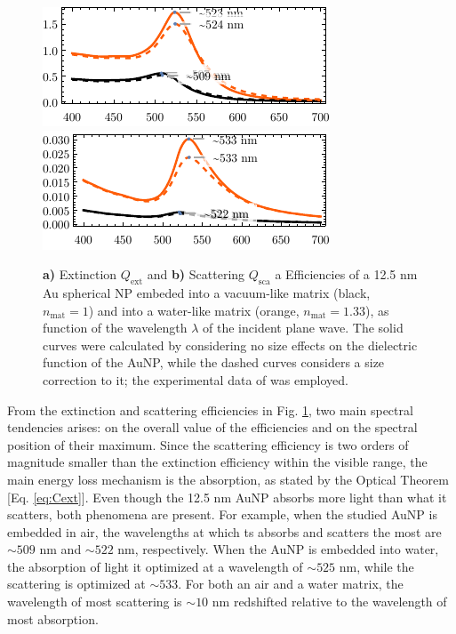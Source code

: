  \begin{figure}[h!]
 \includegraphics[scale=1.4]{1-Theory-Figs/Mie-Au/extinction-12--5nm-Au-in-H2O.pdf}
 \includegraphics[scale=1.4]{1-Theory-Figs/Mie-Au/scattering-12--5nm-Au-in-H2O.pdf}
\caption[Extinction and Scattering Corss Section of a 12.5 nm Au spherical NP embeded into a vacuum- and into a waterlike environment]{ \textbf{a)} Extinction $Q_\text{ext}$ and \textbf{b)} Scattering $Q_\text{sca}$ a Efficiencies of a 12.5 nm Au spherical NP embeded into a vacuum-like matrix (black, $n_\text{mat} = 1$)  and into a water-like matrix (orange, $n_\text{mat} = 1.33$), as function of  the wavelength $\lambda$ of the incident plane wave.  The solid curves were calculated by considering no size effects on the dielectric function of the AuNP, while the dashed curves considers a size correction to it; the experimental data of \citeauthor{johnson_optical_1972} \cite{johnson_optical_1972} was employed.} 
\label{fig:Mieefficiencies} 
 \end{figure}
 
From the extinction and scattering efficiencies in Fig. \ref{fig:Mieefficiencies}, two main spectral tendencies arises: on the overall value of the efficiencies and on the spectral position of their maximum. Since the scattering efficiency is two orders of magnitude smaller than the extinction efficiency within the visible range, the main energy loss mechanism is the absorption, as stated by the Optical Theorem [Eq. \eqref{eq:Cext}]. Even though the 12.5 nm AuNP absorbs more light than what it scatters, both phenomena are present. For example, when the  studied AuNP is embedded in air, the wavelengths at which ts absorbs and scatters the most are $\sim 509$ nm and $\sim 522$ nm, respectively. When the AuNP is embedded into water, the absorption of light it optimized at a wavelength of $\sim 525$ nm, while the scattering is optimized at $\sim 533$. For both an air and a water matrix, the wavelength of most scattering is $\sim 10$ nm redshifted relative to the wavelength of most absorption. 
 
